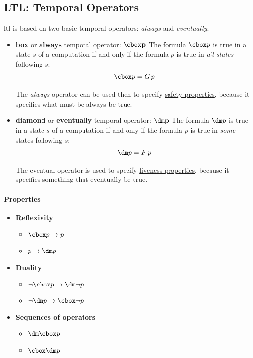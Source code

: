\subsection{LTL: Temporal Operators}\label{sub:an_ltl_temporal_operators} %
\ac{ltl} is based on two basic temporal operators: \textit{always} and \textit{eventually}:
\begin{itemize}
    \item \textbf{box} or \textbf{always} temporal operator: $\cbox \textbf{p}$
        The formula $\cbox p$ is true in a state $s$ of a computation if and only if the formula $p$ is true in \textit{all states} following $s$:
        \[
            \cbox p = G\, p
        \]
        \begin{note}
            The \textit{always} operator can be used then to specify \hyperref[def:safety-prop]{safety properties}, because it specifies what must be always be true.
        \end{note}
    \item \textbf{diamond} or \textbf{eventually} temporal operator: $\dm \textbf{p}$
        The formula $\dm p$ is true in a state $s$ of a computation if and only if the formula $p$ is true in \textit{some} states following $s$:
        \[
            \dm p = F\, p
        \]
        \begin{note}
            The eventual operator is used to specify \hyperref[def:liveness-prop]{liveness properties}, because it specifies something that eventually be true. 
        \end{note}
\end{itemize}
\paragraph{Properties}\label{par:temp_properties} %
\begin{itemize}
    \item \textbf{Reflexivity}
        \begin{itemize}
            \item $\cbox p \to p$
            \item $p \to \dm p$
        \end{itemize}
    \item \textbf{Duality}
        \begin{itemize}
            \item $\neg \cbox p \to \dm\neg p$
            \item $\neg\dm p \to \cbox\neg p$
        \end{itemize}
    \item \textbf{Sequences of operators}
        \begin{itemize}
            \item $\dm\cbox p$
            \item $\cbox\dm p$
        \end{itemize}
\end{itemize}
%
